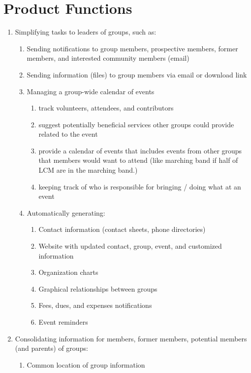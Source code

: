 \documentclass[12pt, oneside, letterpaper]{report}
\begin{document}
	\section{Product Functions}
		\begin{enumerate}
		\item Simplifying tasks to leaders of groups, such as:
			\begin{enumerate}
				\item Sending notifications to group members, prospective
					members, former members, and interested community
					members (email)
				\item Sending information (files) to group members via
					email or download link
				\item Managing a group-wide calendar of events
				\begin{enumerate}
					\item track volunteers, attendees, and contributors
					\item suggest potentially beneficial services other
						groups could provide related to the event
					\item provide a calendar of events that includes events
						from other groups that members would want to attend
						(like marching band if half of LCM are in the
						marching	band.)
					\item keeping track of who is responsible for bringing
						/ doing what at an event
				\end{enumerate}
				\item Automatically generating:
				\begin{enumerate}
					\item Contact information (contact sheets, phone
						directories)
					\item Website with updated contact, group, event, and
						customized information
					\item Organization charts
					\item Graphical relationships between groups
					\item Fees, dues, and expenses notifications
					\item Event reminders
				\end{enumerate}
			\end{enumerate}
			\item Consolidating information for members, former members,
				potential members (and parents) of groups:
			\begin{enumerate}
				\item Common location of group information

\end{enumerate}
\end{enumerate}
\end{document}
